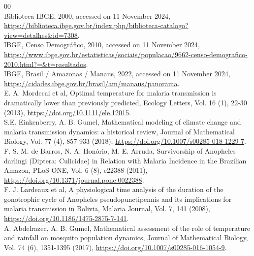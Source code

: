 \documentclass[a4paper,fleqn]{cas-dc}
\begin{document}
\begin{thebibliography}{00}
\\
 Biblioteca IBGE, 2000, accessed on 11 November 2024, \href{https://biblioteca.ibge.gov.br/index.php/biblioteca-catalogo?view=detalhes\&id=7308}{https://biblioteca.ibge.gov.br/index.php/biblioteca-catalogo?view=detalhes\&id=7308}.
\\
 IBGE, Censo Demográfico, 2010, accessed on 11 November 2024, \href{https://www.ibge.gov.br/estatisticas/sociais/populacao/9662-censo-demografico-2010.html?=\&t=resultados}{https://www.ibge.gov.br/estatisticas/sociais/populacao/9662-censo-demografico-2010.html?=\&t=resultados}.
\\
 IBGE, Brasil / Amazonas / Manaus, 2022, accessed on 11 November 2024, \href{https://cidades.ibge.gov.br/brasil/am/manaus/panorama}{https://cidades.ibge.gov.br/brasil/am/manaus/panorama}.
\\
 E. A. Mordecai et al, Optimal temperature for malaria transmission is dramatically lower than previously predicted, Ecology Letters, Vol. 16 (1), 22-30 (2013), \href{ https://doi.org/10.1111/ele.12015}{ https://doi.org/10.1111/ele.12015}.
\\
 S.E. Einkenberry, A. B. Gumel, Mathematical modeling of climate change and malaria transmission dynamics: a historical review, Journal of Mathematical Biology, Vol. 77 (4), 857-933 (2018), \href{https://doi.org/10.1007/s00285-018-1229-7}{https://doi.org/10.1007/s00285-018-1229-7}.
\\
 F. S. M. de Barros, N. A. Honório, M. E. Arruda, Survivorship of Anopheles darlingi (Diptera: Culicidae) in Relation with Malaria Incidence in the Brazilian Amazon, PLoS ONE, Vol. 6 (8), e22388 (2011), \href{https://doi.org/10.1371/journal.pone.0022388}{https://doi.org/10.1371/journal.pone.0022388}.
\\
 F. J. Lardeaux et al, A physiological time analysis of the duration of the gonotrophic cycle of Anopheles pseudopunctipennis and its implications for malaria transmission in Bolivia, Malaria Journal, Vol. 7, 141 (2008), \href{https://doi.org/10.1186/1475-2875-7-141}{https://doi.org/10.1186/1475-2875-7-141}.
\\
 A. Abdelrazec, A. B. Gumel, Mathematical assessment of the role of temperature and rainfall on mosquito population dynamics, Journal of Mathematical Biology, Vol. 74 (6), 1351-1395 (2017), \href{https://doi.org/10.1007/s00285-016-1054-9}{https://doi.org/10.1007/s00285-016-1054-9}.

\end{thebibliography}
\end{document}
